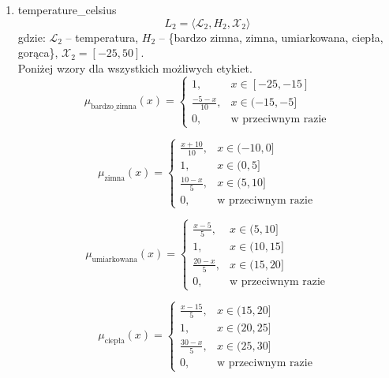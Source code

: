 \documentclass{article}
\begin{document}
\begin{enumerate}
    \item temperature\_celsius
        \begin{equation}
            L_2 = \langle \mathcal{L}_2, H_2, \mathcal{X}_2 \rangle
        \end{equation}
        gdzie: $\mathcal{L}_2$ – temperatura, $H_2$ – \{bardzo zimna, zimna, umiarkowana, ciepła, gorąca\}, $\mathcal{X}_2 = [-25, 50]$. \\
        Poniżej wzory dla wszystkich możliwych etykiet.
                \begin{equation}
                   \mu_{\text{bardzo\_zimna}}(x) =
                    \begin{cases}
                    1, & x \in [-25, -15] \\
                    \frac{-5 - x}{10}, & x \in (-15, -5] \\
                    0, & \text{w przeciwnym razie}
                    \end{cases}
                \end{equation}
                
                \begin{equation}
                   \mu_{\text{zimna}}(x) =
                    \begin{cases}
                    \frac{x + 10}{10}, & x \in (-10, 0] \\
                    1, & x \in (0, 5] \\
                    \frac{10 - x}{5}, & x \in (5, 10] \\
                    0, & \text{w przeciwnym razie}
                    \end{cases}
                \end{equation}

                \begin{equation}
                    \mu_{\text{umiarkowana}}(x) =
                    \begin{cases}
                    \frac{x - 5}{5}, & x \in (5, 10] \\
                    1, & x \in (10, 15] \\
                    \frac{20 - x}{5}, & x \in (15, 20] \\
                    0, & \text{w przeciwnym razie}
                    \end{cases}
                \end{equation}

                \begin{equation}
                    \mu_{\text{ciepła}}(x) =
                    \begin{cases}
                    \frac{x - 15}{5}, & x \in (15, 20] \\
                    1, & x \in (20, 25] \\
                    \frac{30 - x}{5}, & x \in (25, 30] \\
                    0, & \text{w przeciwnym razie}
                    \end{cases}
                \end{equation}


\end{enumerate}
\end{document}
